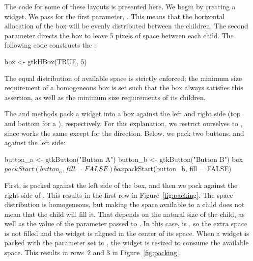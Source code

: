 The code for some of these layouts is presented here. We begin by
creating a  widget. We pass  for the first
parameter, . This means that the
horizontal allocation of the box will be evenly distributed between
the children.  The second parameter directs the box to leave 5 pixels
of space between each child.  The following code constructs the
:
\begin{Schunk}
\begin{Sinput}
 box <- gtkHBox(TRUE, 5)
\end{Sinput}
\end{Schunk}
The equal distribution of available space is strictly enforced; the
minimum size requirement of a homogeneous box is set such that the box
always satisfies this assertion, as well as the minimum size
requirements of its children.

The  and  methods pack a
widget into a box against the left and right side (top and
bottom for a ), respectively. For this explanation, we
restrict ourselves to , since
 works the same except for the
direction. Below, we pack two buttons,  and
 against the left side:
\begin{Schunk}
\begin{Sinput}
 button_a <- gtkButton("Button A")
 button_b <- gtkButton("Button B")
 box$packStart(button_a, fill = FALSE)
 box$packStart(button_b, fill = FALSE)
\end{Sinput}
\end{Schunk}
%
First,  is packed against the left side of the box,
and then we pack  against the right side of
. This results in the first row in
Figure~\ref{fig:packing}. The space distribution is homogeneous, but
making the space available to a child does not mean that the child
will fill it. That depends on the natural size of the child, as well
as the value of the  parameter passed
to . In this case,
 is , so the extra space
is not filled and the widget is aligned in the center of its
space. When a widget is packed with the
 parameter set to , the
widget is resized to consume the available space. This results in
rows~$2$ and $3$ in Figure~\ref{fig:packing}.

